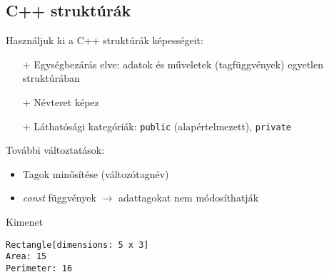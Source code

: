 \documentclass[usenames,dvipsnames,aspectratio=169]{beamer}
\begin{document}
\subsection{C++ struktúrák}

\begin{frame}
    Használjuk ki a C++ struktúrák képességeit:
    \begin{itemize}
        \item[$+$] Egységbezárás elve: adatok és műveletek (tagfüggvények) egyetlen struktúrában
        \item[$+$] Névteret képez 
        \item[$+$] Láthatósági kategóriák: \texttt{public} (alapértelmezett), \texttt{private} 
    \end{itemize}
    \vfill
    További változtatások:
    \begin{itemize}
        \item Tagok minősítése (változótagnév)
        \item \emph{const} függvények $\to$ adattagokat nem módosíthatják
    \end{itemize}
\end{frame}

\begin{frame}
    \begin{exampleblock}{}
        \small
        
    \end{exampleblock}
\end{frame}

\begin{frame}
    \begin{exampleblock}{}
        \small
        
    \end{exampleblock}
\end{frame}

\begin{frame}[fragile]
    \begin{exampleblock}{}
        \scriptsize
        
    \end{exampleblock}
    \begin{block}{Kimenet}
        \vspace{-.3cm}
        \tiny
        \begin{verbatim}
Rectangle[dimensions: 5 x 3]
Area: 15
Perimeter: 16
\end{verbatim}
    \vspace{-.3cm}
    \end{block}
\end{frame}
\end{document}
